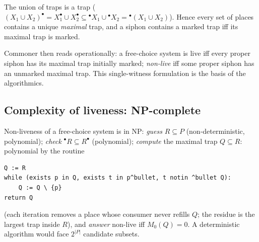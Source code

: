 \begin{lemma}
The union of traps is a trap ($(X_1 \cup X_2)^\bullet = X_1^\bullet \cup X_2^\bullet \subseteq {}^\bullet X_1 \cup {}^\bullet X_2 = {}^\bullet(X_1 \cup X_2)$). Hence every set of places contains a unique \emph{maximal} trap, and a siphon contains a marked trap iff its maximal trap is marked.
\end{lemma}

Commoner then reads operationally: a free-choice system is live iff every proper siphon has its maximal trap initially marked; \emph{non-live} iff some proper siphon has an unmarked maximal trap. This single-witness formulation is the basis of the algorithmics.

\subsection{Complexity of liveness: NP-complete}

Non-liveness of a free-choice system is in \textsf{NP}: \emph{guess} $R \subseteq P$ (non-deterministic, polynomial); \emph{check} ${}^\bullet R \subseteq R^\bullet$ (polynomial); \emph{compute} the maximal trap $Q \subseteq R$: polynomial by the routine
\begin{lstlisting}
Q := R
while (exists p in Q, exists t in p^bullet, t notin ^bullet Q):
    Q := Q \ {p}
return Q
\end{lstlisting}
(each iteration removes a place whose consumer never refills $Q$; the residue is the largest trap inside $R$), and \emph{answer} non-live iff $M_0(Q) = 0$. A deterministic algorithm would face $2^{|P|}$ candidate subsets.

